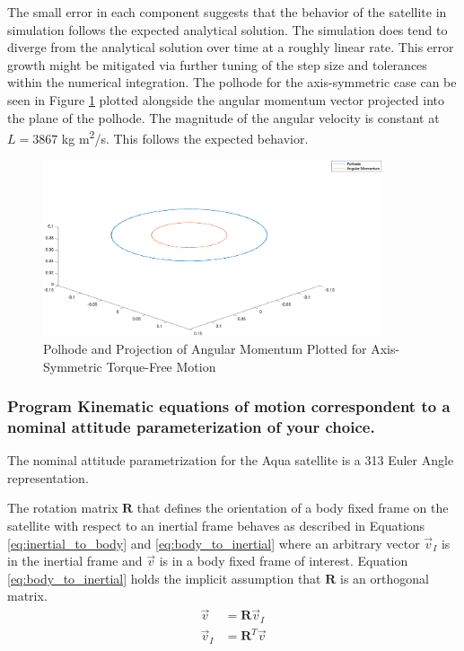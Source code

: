 The small error in each component suggests that the behavior of the satellite in simulation follows the expected analytical solution. The simulation does tend to diverge from the analytical solution over time at a roughly linear rate. This error growth might be mitigated via further tuning of the step size and tolerances within the numerical integration. The polhode for the axis-symmetric case can be seen in Figure \ref{fig:axis_symmetric_polhode} plotted alongside the angular momentum vector projected into the plane of the polhode. The magnitude of the angular velocity is constant at $L = 3867$ kg m\textsuperscript{2}/s. This follows the expected behavior.

\begin{figure}[H]
    \centering
    \captionsetup{justification = centering}
    \includegraphics[width = 10cm]{Images/axis_symmetric_polhode.png}
    \caption{Polhode and Projection of Angular Momentum Plotted for Axis-Symmetric Torque-Free Motion}
    \label{fig:axis_symmetric_polhode}
\end{figure}

\subsubsection{Program Kinematic equations of motion correspondent to a nominal attitude parameterization of your choice.}

The nominal attitude parametrization for the Aqua satellite is a 313 Euler Angle representation. 

The rotation matrix $\boldsymbol{R}$ that defines the orientation of a body fixed frame on the satellite with respect to an inertial frame behaves as described in Equations \ref{eq:inertial_to_body} and \ref{eq:body_to_inertial} where an arbitrary vector $\vec{v}_I$ is in the inertial frame and $\vec{v}$ is in a body fixed frame of interest. Equation \ref{eq:body_to_inertial} holds the implicit assumption that $\boldsymbol{R}$ is an orthogonal matrix. 
\begin{eqnarray}
    \vec{v} &= \boldsymbol{R} \vec{v}_I \label{eq:inertial_to_body} \\
    \vec{v}_I &= \boldsymbol{R}^T \vec{v} \label{eq:body_to_inertial}
\end{eqnarray}
